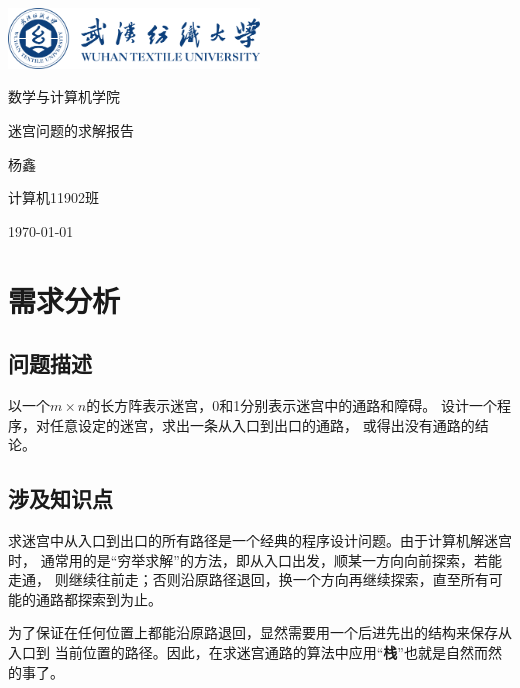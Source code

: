 \documentclass{ctexart}
\newcommand{\makecover}[4]{
    \begin{titlepage}
        \centering
        \includegraphics[width=0.5\textwidth]{logo.png}\par
        \vspace{1cm}
        {\kaishu\ziju{0.1}\Huge 数学与计算机学院}\par
        \vspace{6cm}
        {\heiti\ziju{0.1}\zihao{0} #1}\par
        \vspace{6cm}
        {\kaishu\ziju{0.1}\Huge #2}\par
        \vspace{0.7cm}
        {\kaishu\Large #3}\par
        \vspace{1.5cm}
        {\kaishu\large #4}
    \end{titlepage}
}
\begin{document}
    \makecover{迷宫问题的求解报告}{杨鑫}{计算机11902班}{\today}

    \section{需求分析}

    \subsection{问题描述}

    以一个$m\times n$的长方阵表示迷宫，0和1分别表示迷宫中的通路和障碍。
    设计一个程序，对任意设定的迷宫，求出一条从入口到出口的通路，
    或得出没有通路的结论。

    \subsection{涉及知识点}
    求迷宫中从入口到出口的所有路径是一个经典的程序设计问题。由于计算机解迷宫时，
    通常用的是“穷举求解”的方法，即从入口出发，顺某一方向向前探索，若能走通，
    则继续往前走；否则沿原路径退回，换一个方向再继续探索，直至所有可能的通路都探索到为止。
    
    为了保证在任何位置上都能沿原路退回，显然需要用一个后进先出的结构来保存从入口到
    当前位置的路径。因此，在求迷宫通路的算法中应用“{\textbf 栈}”也就是自然而然的事了。
    
\end{document}

